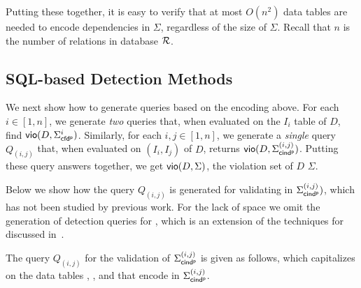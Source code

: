 Putting these together, it is easy to verify that at most $O(n^2)$
data tables are needed to encode dependencies in $\Sigma$,
regardless of the size of $\Sigma$. Recall that $n$ is the number of
relations in database $\R$.


\vspace{-1ex}
\subsection{SQL-based Detection Methods}

We next show how to generate \SQL queries based on the encoding
above. For each $i\in [1, n]$, we generate {\em two} \SQL queries
that, when evaluated on the $I_i$ table of $D$, find ${\mathsf{vio}}(D,
\Sigma_{{\mathsf{cfd^p}}}^i)$. Similarly, for each $i,j \in [1, n]$, we generate a {\em
single} \SQL query $Q_{(i,j)}$ that, when evaluated on $(I_i, I_j)$
of $D$, returns ${\mathsf{vio}}(D, \Sigma_{{\mathsf{cind^p}}}^{(i,j)})$. Putting these query
answers together, we get ${\mathsf{vio}}(D, \Sigma)$, the violation set of
$D$ \wrt $\Sigma$.


Below we show how the \SQL query $Q_{(i,j)}$ is generated for
validating \pCINDs in $\Sigma_{{\mathsf{cind^p}}}^{(i,j)})$, which has not been studied
by previous work. For the lack of space we omit the generation of
detection queries for \pCFDs, which is an extension of the
\SQL techniques for \CFDs discussed in~\cite{CFDs,icde08}.

The query $Q_{(i,j)}$ for the validation of $\Sigma_{{\mathsf{cind^p}}}^{(i,j)}$
is given as follows, which capitalizes on the data tables
\Enc{}, ,  and \Enc{\ne} that encode \pCINDs in
$\Sigma_{{\mathsf{cind^p}}}^{(i,j)}$.



\begin{footnotesize}
\end{footnotesize}

